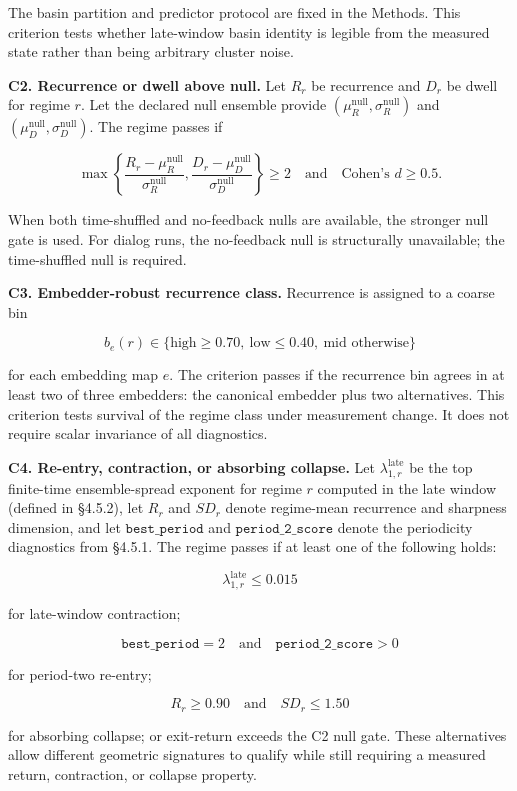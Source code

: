 \documentclass{article}
\theoremstyle{plain}
\theoremstyle{definition}
\begin{document}
The basin partition and predictor protocol are fixed in the Methods. This criterion tests whether late-window basin identity is legible from the measured state rather than being arbitrary cluster noise.

\textbf{C2. Recurrence or dwell above null.} Let \(R_r\) be recurrence and \(D_r\) be dwell for regime \(r\). Let the declared null ensemble provide \((\mu_R^{\mathrm{null}},\sigma_R^{\mathrm{null}})\) and \((\mu_D^{\mathrm{null}},\sigma_D^{\mathrm{null}})\). The regime passes if

\[\max\left\{
\frac{R_r-\mu_R^{\mathrm{null}}}{\sigma_R^{\mathrm{null}}},
\frac{D_r-\mu_D^{\mathrm{null}}}{\sigma_D^{\mathrm{null}}}
\right\}
\ge 2
\quad
\text{and}
\quad
\text{Cohen's } d\ge 0.5.\]

When both time-shuffled and no-feedback nulls are available, the stronger null gate is used. For dialog runs, the no-feedback null is structurally unavailable; the time-shuffled null is required.

\textbf{C3. Embedder-robust recurrence class.} Recurrence is assigned to a coarse bin

\[b_e(r)\in
\{\text{high}\ge 0.70,\ \text{low}\le 0.40,\ \text{mid otherwise}\}\]

for each embedding map \(e\). The criterion passes if the recurrence bin agrees in at least two of three embedders: the canonical embedder plus two alternatives. This criterion tests survival of the regime class under measurement change. It does not require scalar invariance of all diagnostics.

\textbf{C4. Re-entry, contraction, or absorbing collapse.} Let \(\lambda_{1,r}^{\mathrm{late}}\) be the top finite-time ensemble-spread exponent for regime \(r\) computed in the late window (defined in §4.5.2), let \(R_r\) and \(SD_r\) denote regime-mean recurrence and sharpness dimension, and let \(\texttt{best\_period}\) and \(\texttt{period\_2\_score}\) denote the periodicity diagnostics from §4.5.1. The regime passes if at least one of the following holds:

\[\lambda_{1,r}^{\mathrm{late}}\le 0.015\]

for late-window contraction;

\[\texttt{best\_period}=2
\quad\text{and}\quad
\texttt{period\_2\_score}>0\]

for period-two re-entry;

\[R_r\ge 0.90
\quad\text{and}\quad
SD_r\le 1.50\]

for absorbing collapse; or exit-return exceeds the C2 null gate. These alternatives allow different geometric signatures to qualify while still requiring a measured return, contraction, or collapse property.
\end{document}
